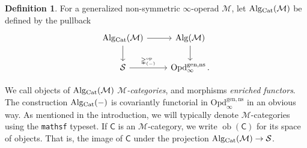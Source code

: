 \documentclass[10pt]{amsart}
\numberwithin{equation}{section}
\theoremstyle{definition}
\newtheorem{definition}[prop]{Definition}
\DeclareMathOperator{\ob}{ob}
\DeclareMathOperator{\op}{op}
\newcommand{\Cat}{\mathrm{Cat}\vphantom{t}}
\newcommand{\Alg}{\mathrm{Alg}\vphantom{z}}
\newcommand{\Simp}{\mathbb{\Delta}}
\newcommand{\cM}{\mathcal{M}}
\newcommand{\cS}{\mathcal{S}}
\newcommand{\Opd}{\mathrm{Opd}^{\mathrm{gen,ns}}_{\infty}}
\renewcommand{\to}{\mathchoice{\longrightarrow}{\rightarrow}{}{}}
\begin{document}
	\begin{definition}\label{def:Alg_Cat}
		For a generalized non-symmetric $\infty$-operad $\cM$, let $\Alg_{\Cat}(\cM)$ be defined by the pullback
		\begin{equation*}
			\begin{tikzcd}
				\Alg_{\Cat}(\cM) \arrow[r] \arrow[d] & \Alg(\cM) \arrow[d] \\
				\cS \arrow[r, "\Simp^{\op}_{(-)}"] & \Opd \,.
			\end{tikzcd}
		\end{equation*}
	\end{definition}

	We call objects of $\Alg_{\Cat}(\cM)$ \emph{$\cM$-categories}, and morphisms \emph{enriched functors}.
  The construction $\Alg_{\Cat}(-)$ is covariantly functorial in $\Opd$ in an obvious way.
	As mentioned in the introduction, we will typically denote $\cM$-categories using the \texttt{mathsf} typeset.
	If $\mathsf{C}$ is an $\cM$-category, we write $\ob(\mathsf{C})$ for its space of objects.
	That is, the image of $\mathsf{C}$ under the projection $\Alg_{\Cat}(\cM) \to \cS$.
\end{document}
